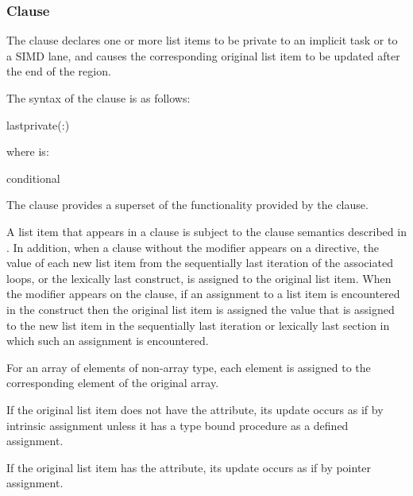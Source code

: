 \subsubsection{ Clause}
\label{subsubsec:lastprivate clause}
\summary
The  clause declares one or more list items to be private to an implicit
task or to a SIMD lane, and causes the corresponding original list item to be updated
after the end of the region.

\syntax
The syntax of the  clause is as follows:

\begin{ompSyntax}
lastprivate(\plc{[ lastprivate-modifier}:\plc{] list})
\end{ompSyntax}

where  is:
\begin{indentedcodelist}
conditional
\end{indentedcodelist}

\descr
The  clause provides a superset of the functionality provided by the
 clause.

A list item that appears in a  clause is subject to the  clause
semantics described in
.
In addition, when a
 clause without the  modifier appears on a directive,
the value of each new list item from the sequentially last iteration
of the associated loops, or the lexically last  construct, is assigned to the
original list item. When the  modifier appears on the clause,
if an assignment to a list item is encountered in the construct then the
original list item is assigned the value that is assigned to the new list item
in the sequentially last iteration or lexically last section in which such an
assignment is encountered.


\begin{ccppspecific}
For an array of elements of non-array type, each element is assigned to the
corresponding element of the original array.
\end{ccppspecific}
%
\begin{fortranspecific}
If the original list item does not have the  attribute,
its update occurs as if by intrinsic assignment unless it has a type
bound procedure as a defined assignment.

If the original list item has the  attribute, its update occurs as if by pointer
assignment.
\end{fortranspecific}

